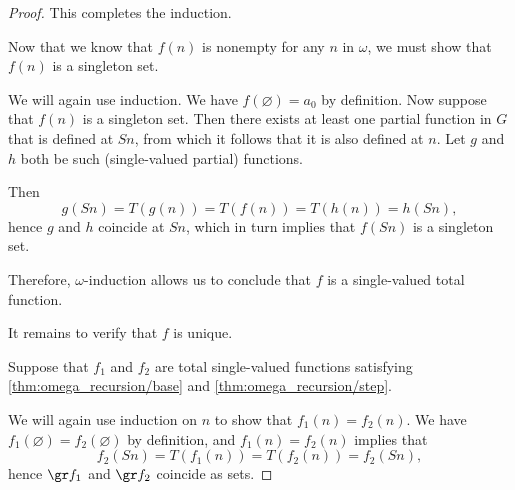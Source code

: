 \begin{proof}
  This completes the induction.

   Now that we know that \( f(n) \) is nonempty for any \( n \) in \( \omega \), we must show that \( f(n) \) is a singleton set.

  We will again use induction. We have \( f(\varnothing) = a_0 \) by definition. Now suppose that \( f(n) \) is a singleton set. Then there exists at least one partial function in \( G \) that is defined at \( Sn \), from which it follows that it is also defined at \( n \). Let \( g \) and \( h \) both be such (single-valued partial) functions.

  Then
  \begin{equation*}
    g(Sn) = T(g(n)) = T(f(n)) = T(h(n)) = h(Sn),
  \end{equation*}
  hence \( g \) and \( h \) coincide at \( Sn \), which in turn implies that \( f(Sn) \) is a singleton set.

  Therefore, \( \omega \)-induction allows us to conclude that \( f \) is a single-valued total function.

   It remains to verify that \( f \) is unique.

  Suppose that \( f_1 \) and \( f_2 \) are total single-valued functions satisfying \cref{thm:omega_recursion/base} and \cref{thm:omega_recursion/step}.

  We will again use induction on \( n \) to show that \( f_1(n) = f_2(n) \). We have \( f_1(\varnothing) = f_2(\varnothing) \) by definition, and \( f_1(n) = f_2(n) \) implies that
  \begin{equation*}
    f_2(Sn) = T(f_1(n)) = T(f_2(n)) = f_2(Sn),
  \end{equation*}
  hence \( \gr f_1 \) and \( \gr f_2 \) coincide as sets.
\end{proof}

